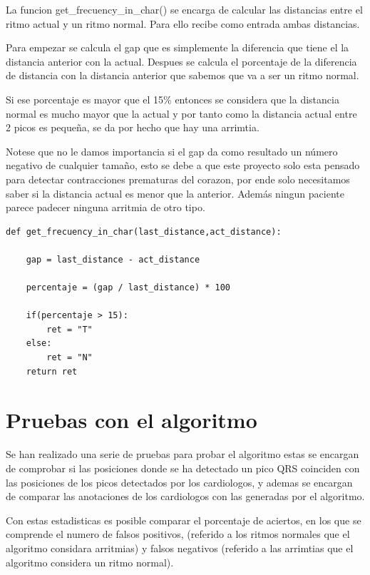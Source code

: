 La funcion get\_frecuency\_in\_char() se encarga de calcular las distancias entre el ritmo actual y un ritmo normal. 
Para ello recibe como entrada ambas distancias.

Para empezar se calcula el gap que es simplemente la diferencia que tiene el la distancia anterior con la actual.
Despues se calcula el porcentaje de la diferencia de distancia con la distancia anterior que sabemos que va a ser 
un ritmo normal.

Si ese porcentaje es mayor que el 15\% entonces se considera que la distancia normal es mucho mayor que la actual
y por tanto como la distancia actual entre 2 picos es pequeña, se da por hecho que hay una arrimtia.

Notese que no le damos importancia si el gap da como resultado un número negativo de cualquier tamaño, esto se debe
a que este proyecto solo esta pensado para detectar contracciones prematuras del corazon, por ende solo necesitamos 
saber si la distancia actual es menor que la anterior. Además ningun paciente parece padecer ninguna arritmia de otro
tipo.

\lstset{language=python, breaklines=true, basicstyle=\footnotesize}
\begin{lstlisting}[frame=single]
def get_frecuency_in_char(last_distance,act_distance): 

    gap = last_distance - act_distance

    percentaje = (gap / last_distance) * 100

    if(percentaje > 15):
        ret = "T"
    else:
        ret = "N"
    return ret

\end{lstlisting}

\section{Pruebas con el algoritmo}

Se han realizado una serie de pruebas para probar el algoritmo estas se encargan de comprobar si las posiciones donde
se ha detectado un pico QRS coinciden con las posiciones de los picos detectados por los cardiologos, y ademas se 
encargan de comparar las anotaciones de los cardiologos con las generadas por el algoritmo.

Con estas estadisticas es posible comparar el porcentaje de aciertos, en los que se comprende el numero de 
falsos positivos, (referido a los ritmos normales que el algoritmo considara arritmias) y 
falsos negativos (referido a las arrimtias que el algoritmo considera un ritmo normal).


